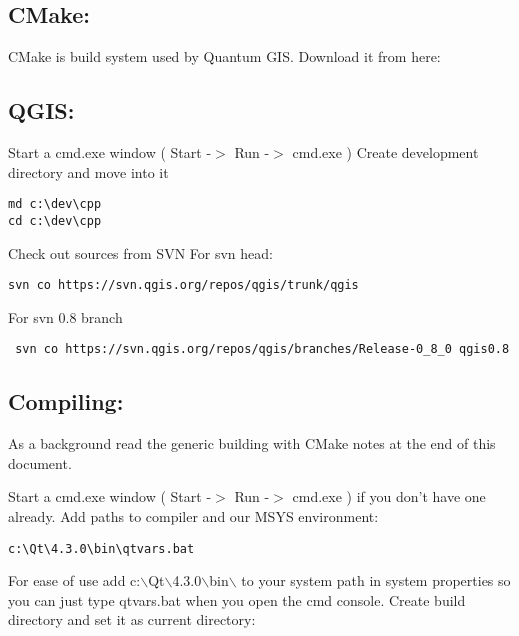 
\subsection{CMake:}
CMake is build system used by Quantum GIS. Download it from here:


\subsection{QGIS:}
Start a cmd.exe window ( Start -$>$ Run -$>$ cmd.exe ) Create development 
directory and move into it

\begin{verbatim}
md c:\dev\cpp 
cd c:\dev\cpp 
\end{verbatim}

Check out sources from SVN For svn head:

\begin{verbatim}
svn co https://svn.qgis.org/repos/qgis/trunk/qgis 
\end{verbatim}
For svn 0.8 branch

\begin{verbatim}
 svn co https://svn.qgis.org/repos/qgis/branches/Release-0_8_0 qgis0.8
\end{verbatim}

\subsection{Compiling:}
As a background read the generic building with CMake notes at the end of 
this document.

Start a cmd.exe window ( Start -$>$ Run -$>$ cmd.exe ) if you don't have one
already.  Add paths to compiler and our MSYS environment:

\begin{verbatim}
c:\Qt\4.3.0\bin\qtvars.bat 
\end{verbatim}

For ease of use add c:$\backslash$Qt$\backslash$4.3.0$\backslash$bin$\backslash$ to your system path in system
properties so you can just type qtvars.bat when you open the cmd console.
Create build directory and set it as current directory:

